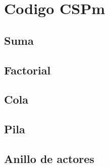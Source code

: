 \chapter{Codigo CSPm}\label{codigo}

\section{Suma}\label{codigo:suma}



\section{Factorial}\label{codigo:factorial}



\section{Cola}\label{codigo:cola}



\section{Pila}\label{codigo:pila}



\section{Anillo de actores}\label{codigo:anillo}






